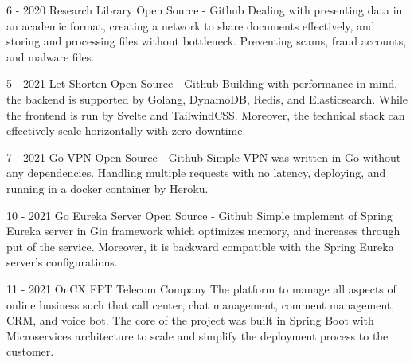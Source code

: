 \documentclass[10pt,A4]{article}
\begin{document}
\begin{paracol}{2}
\begin{rightcolumn}
{}
	
\cvevent
	{6 - 2020}
	{Research Library}
	{Open Source - Github}
	{Dealing with presenting data in an academic format, creating a network to share documents effectively, and storing and processing files without bottleneck. Preventing scams, fraud accounts, and malware files.}
	
\cvevent
	{5 - 2021}
	{Let Shorten}
	{Open Source - Github}
	{Building with performance in mind, the backend is supported by Golang, DynamoDB, Redis, and Elasticsearch. While the frontend is run by Svelte and TailwindCSS. Moreover, the technical stack can effectively scale horizontally with zero downtime.}
	
\cvevent
	{7 - 2021}
	{Go VPN}
	{Open Source - Github}
	{Simple VPN was written in Go without any dependencies. Handling multiple requests with no latency, deploying, and running in a docker container by Heroku.}

\cvevent
	{10 - 2021}
	{Go Eureka Server}
	{Open Source - Github}
	{Simple implement of Spring Eureka server in Gin framework which optimizes memory, and increases through put of the service. Moreover, it is backward compatible with the Spring Eureka server's configurations.}
	
\cvevent
	{11 - 2021}
	{OnCX}
	{FPT Telecom Company}
	{The platform to manage all aspects of online business such that call center, chat management, comment management, CRM, and voice bot. The core of the project was built in Spring Boot with Microservices architecture to scale and simplify the deployment process to the customer.}

\end{rightcolumn}
\end{paracol}
\end{document}
